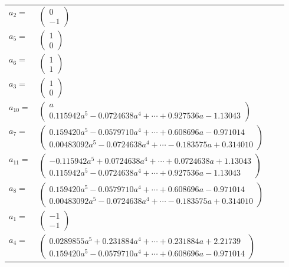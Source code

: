 \documentclass[1p]{elsarticle_modified}
\theoremstyle{definition}
\begin{document}
\begin{tabular}{m{7pt} m{180pt} m{7pt} m{180pt} }
\flushright $a_{2}=$&$\begin{pmatrix}0\\-1\end{pmatrix}$ \\
\flushright $a_{5}=$&$\begin{pmatrix}1\\0\end{pmatrix}$ \\
\flushright $a_{6}=$&$\begin{pmatrix}1\\1\end{pmatrix}$ \\
\flushright $a_{3}=$&$\begin{pmatrix}1\\0\end{pmatrix}$ \\
\flushright $a_{10}=$&$\begin{pmatrix}a\\0.115942 a^{5}-0.0724638 a^{4}+\cdots+0.927536 a-1.13043\end{pmatrix}$ \\
\flushright $a_{7}=$&$\begin{pmatrix}0.159420 a^{5}-0.0579710 a^{4}+\cdots+0.608696 a-0.971014\\0.00483092 a^{5}-0.0724638 a^{4}+\cdots-0.183575 a+0.314010\end{pmatrix}$ \\
\flushright $a_{11}=$&$\begin{pmatrix}-0.115942 a^{5}+0.0724638 a^{4}+\cdots+0.0724638 a+1.13043\\0.115942 a^{5}-0.0724638 a^{4}+\cdots+0.927536 a-1.13043\end{pmatrix}$ \\
\flushright $a_{8}=$&$\begin{pmatrix}0.159420 a^{5}-0.0579710 a^{4}+\cdots+0.608696 a-0.971014\\0.00483092 a^{5}-0.0724638 a^{4}+\cdots-0.183575 a+0.314010\end{pmatrix}$ \\
\flushright $a_{1}=$&$\begin{pmatrix}-1\\-1\end{pmatrix}$ \\
\flushright $a_{4}=$&$\begin{pmatrix}0.0289855 a^{5}+0.231884 a^{4}+\cdots+0.231884 a+2.21739\\0.159420 a^{5}-0.0579710 a^{4}+\cdots+0.608696 a-0.971014\end{pmatrix}$ \\

\end{tabular}
\end{document}
